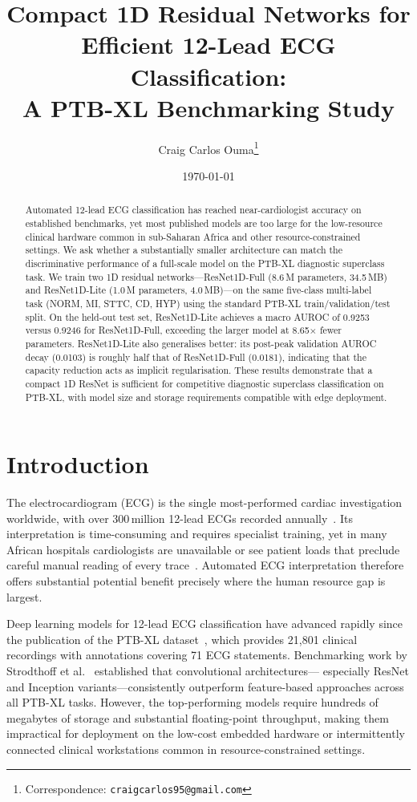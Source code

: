 \documentclass[11pt]{article}
\title{\textbf{Compact 1D Residual Networks for Efficient
12-Lead ECG Classification:\\
A PTB-XL Benchmarking Study}}
\author[1]{Craig Carlos Ouma\thanks{%
Correspondence: \texttt{craigcarlos95@gmail.com}}}
\affil[1]{Independent Researcher}
\date{\today}
\begin{document}
\maketitle

\begin{abstract}
\noindent
Automated 12-lead ECG classification has reached near-cardiologist accuracy on
established benchmarks, yet most published models are too large for the
low-resource clinical hardware common in sub-Saharan Africa and other
resource-constrained settings. We ask whether a substantially smaller
architecture can match the discriminative performance of a full-scale model
on the PTB-XL diagnostic superclass task. We train two 1D residual
networks---ResNet1D-Full (8.6\,M parameters, 34.5\,MB) and ResNet1D-Lite
(1.0\,M parameters, 4.0\,MB)---on the same five-class multi-label task
(NORM, MI, STTC, CD, HYP) using the standard PTB-XL train/validation/test
split. On the held-out test set, ResNet1D-Lite achieves a macro AUROC of
0.9253 versus 0.9246 for ResNet1D-Full, exceeding the larger model at
8.65$\times$ fewer parameters. ResNet1D-Lite also generalises better:
its post-peak validation AUROC decay (0.0103) is roughly half that of
ResNet1D-Full (0.0181), indicating that the capacity reduction acts as
implicit regularisation. These results demonstrate that a compact 1D
ResNet is sufficient for competitive diagnostic superclass classification
on PTB-XL, with model size and storage requirements compatible with
edge deployment.
\end{abstract}

\section{Introduction}
The electrocardiogram (ECG) is the single most-performed cardiac
investigation worldwide, with over 300\,million 12-lead ECGs recorded
annually~\cite{hannun2019}. Its interpretation is time-consuming and
requires specialist training, yet in many African hospitals cardiologists
are unavailable or see patient loads that preclude careful manual reading
of every trace~\cite{who2021}. Automated ECG interpretation therefore
offers substantial potential benefit precisely where the human resource
gap is largest.

Deep learning models for 12-lead ECG classification have advanced rapidly
since the publication of the PTB-XL dataset~\cite{wagner2020ptbxl},
which provides 21{,}801 clinical recordings with annotations covering
71 ECG statements. Benchmarking work by Strodthoff et
al.~\cite{strodthoff2021} established that convolutional architectures---
especially ResNet and Inception variants---consistently outperform
feature-based approaches across all PTB-XL tasks. However, the top-performing
models require hundreds of megabytes of storage and substantial floating-point
throughput, making them impractical for deployment on the low-cost embedded
hardware or intermittently connected clinical workstations common in
resource-constrained settings.
\end{document}

